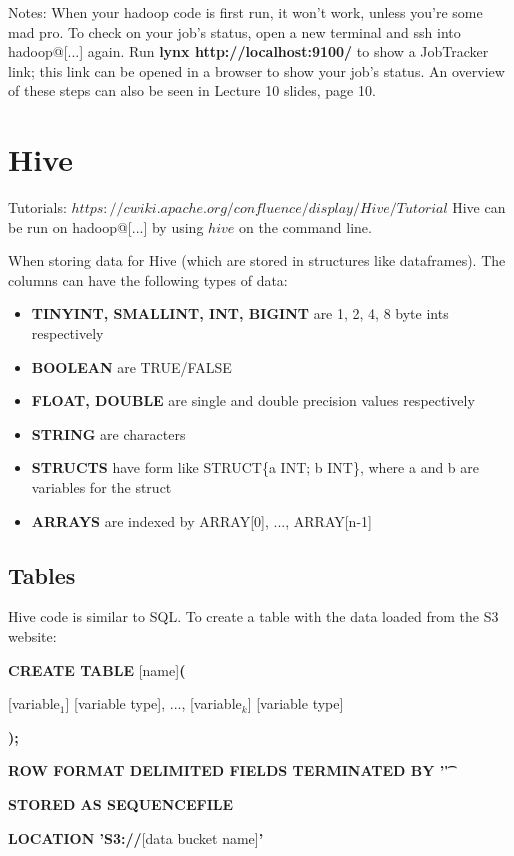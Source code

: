 \documentclass{article}
\begin{document}
Notes: When your hadoop code is first run, it won't work, unless you're some mad pro. To check on your job's status, open a new terminal and ssh into hadoop@[...] again. Run \textbf{lynx http://localhost:9100/} to show a JobTracker link; this link can be opened in a browser to show your job's status. An overview of these steps can also be seen in Lecture 10 slides, page 10.

\section{Hive}

Tutorials: $https://cwiki.apache.org/confluence/display/Hive/Tutorial$
Hive can be run on hadoop@[...] by using $hive$ on the command line.

When storing data for Hive (which are stored in structures like dataframes). The columns can have the following types of data:

\begin{itemize}
\item \textbf{TINYINT, SMALLINT, INT, BIGINT} are 1, 2, 4, 8 byte ints respectively
\item \textbf{BOOLEAN} are TRUE/FALSE
\item \textbf{FLOAT, DOUBLE} are single and double precision values respectively
\item \textbf{STRING} are characters
\item \textbf{STRUCTS} have form like STRUCT\{a INT; b INT\}, where a and b are variables for the struct
\item \textbf{ARRAYS} are indexed by ARRAY[0], ..., ARRAY[n-1]
\end{itemize}

\subsection{Tables}

Hive code is similar to SQL. To create a table with the data loaded from the S3 website:

\textbf{CREATE TABLE }[name]\textbf{(}

[variable$_1$] [variable type], ..., [variable$_k$] [variable type]

\textbf{);}

\textbf{ROW FORMAT DELIMITED FIELDS TERMINATED BY '\t'}

\textbf{STORED AS SEQUENCEFILE}

\textbf{LOCATION 'S3://}[data bucket name]\textbf{'}
\end{document}
